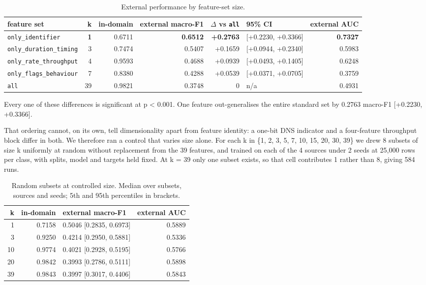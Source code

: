 \documentclass[11pt,a4paper]{article}
\begin{document}
\begin{table}[htbp]\centering\small
\caption{External performance by feature-set size.}
\begin{tabular}{lrrrrlr}
\toprule
feature set & k & in-domain & external macro-F1 & $\Delta$ vs \texttt{all} & 95\% CI & external AUC \\
\midrule
\texttt{only\_identifier} & \textbf{1} & 0.6711 & \textbf{0.6512} & \textbf{+0.2763} & [+0.2230, +0.3366] & \textbf{0.7327} \\
\texttt{only\_duration\_timing} & 3 & 0.7474 & 0.5407 & +0.1659 & [+0.0944, +0.2340] & 0.5983 \\
\texttt{only\_rate\_throughput} & 4 & 0.9593 & 0.4688 & +0.0939 & [+0.0493, +0.1405] & 0.6248 \\
\texttt{only\_flags\_behaviour} & 7 & 0.8380 & 0.4288 & +0.0539 & [+0.0371, +0.0705] & 0.3759 \\
\texttt{all} & 39 & 0.9821 & 0.3748 & 0 & n/a & 0.4931 \\
\bottomrule
\end{tabular}
\end{table}

Every one of these differences is significant at p < 0.001. One feature out-generalises the entire standard set by 0.2763 macro-F1 [+0.2230, +0.3366].

That ordering cannot, on its own, tell dimensionality apart from feature identity: a one-bit DNS indicator and a four-feature throughput block differ in both. We therefore ran a control that varies size alone. For each k in \{1, 2, 3, 5, 7, 10, 15, 20, 30, 39\} we drew 8 subsets of size k uniformly at random without replacement from the 39 features, and trained on each of the 4 sources under 2 seeds at 25,000 rows per class, with splits, model and targets held fixed. At k = 39 only one subset exists, so that cell contributes 1 rather than 8, giving 584 runs.

\begin{table}[htbp]\centering\small
\caption{Random subsets at controlled size. Median over subsets, sources and seeds; 5th and 95th percentiles in brackets.}
\begin{tabular}{rrlr}
\toprule
k & in-domain & external macro-F1 & external AUC \\
\midrule
1 & 0.7158 & 0.5046 [0.2835, 0.6973] & 0.5889 \\
3 & 0.9250 & 0.4214 [0.2950, 0.5881] & 0.5336 \\
10 & 0.9774 & 0.4021 [0.2928, 0.5195] & 0.5766 \\
20 & 0.9842 & 0.3993 [0.2786, 0.5111] & 0.5898 \\
39 & 0.9843 & 0.3997 [0.3017, 0.4406] & 0.5843 \\
\bottomrule
\end{tabular}
\end{table}
\end{document}
